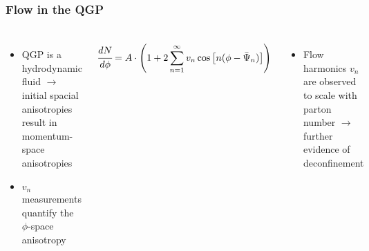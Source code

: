 \begin{frame}
  \frametitle{\textbf{Flow in the QGP}}
  \begin{columns}
    \begin{itemize}
    \item QGP is a hydrodynamic fluid $\to$ initial spacial anisotropies result in momentum-space anisotropies
    \item $v_n$ measurements quantify the $\phi$-space anisotropy
    \end{itemize}
    \begin{align*}
      \cfrac{dN}{d\phi} = A \cdot \left( 1 + 2\sum_{n = 1}^{\infty} v_n \cos\left[n(\phi - \bar{\Psi}_{n})\right]   \right) 
    \end{align*}
    \begin{itemize}
    \item Flow harmonics $v_n$ are observed to scale with parton number $\to$ further evidence of deconfinement
    \end{itemize}
  \end{columns}
\end{frame}
